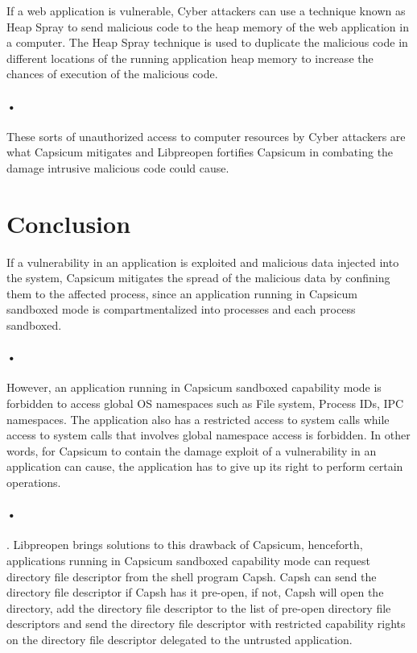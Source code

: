 \documentclass{article}
\begin{document}
If a web application is vulnerable, Cyber attackers can use a technique known as  Heap Spray to send malicious code to the heap memory of the web application in a computer. The Heap Spray technique is used to duplicate the malicious code in different locations of the running application heap memory to increase the chances of execution of the malicious code. \paragraph*{•}
These sorts of unauthorized access to computer resources by Cyber attackers are what Capsicum mitigates and Libpreopen fortifies Capsicum in combating the damage intrusive malicious code could cause.
\section{Conclusion}
If a vulnerability in an application is exploited and malicious data injected into the system, Capsicum mitigates the spread of the malicious data by confining them to the affected process, since an application running in Capsicum sandboxed mode is compartmentalized into processes and each process sandboxed.\paragraph*{•} 
However, an application running in Capsicum sandboxed capability mode is forbidden to access global OS namespaces such as File system, Process IDs, IPC namespaces. The application also has a restricted access to system calls while access to system calls that involves global namespace access is forbidden.  In other words, for Capsicum to contain the damage exploit of a vulnerability in an application can cause, the application has to give up its right to perform certain operations.\paragraph*{•}.
Libpreopen brings solutions to this drawback of Capsicum, henceforth, applications running in Capsicum sandboxed capability mode can request directory file descriptor from the shell program Capsh. Capsh can send the directory file descriptor if Capsh has it pre-open, if not,  Capsh will open the directory, add the directory file descriptor to the list of pre-open directory file descriptors and send the directory file descriptor with restricted capability rights on the directory file descriptor delegated to the untrusted application.
\end{document}
